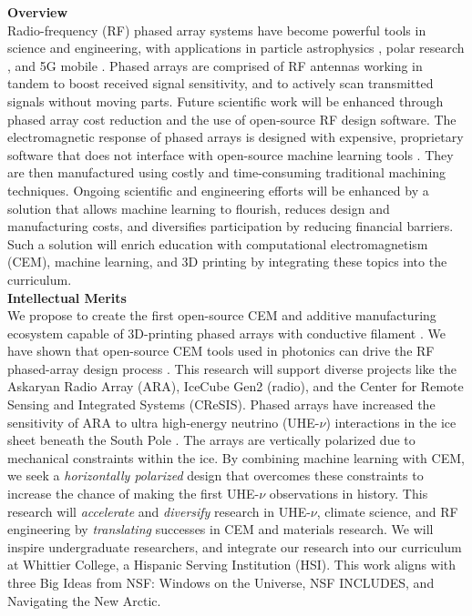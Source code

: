\documentclass[11pt]{amsart}
\begin{document}

\noindent \textbf{Overview} \\ \noindent Radio-frequency (RF) phased array systems have become powerful tools in science and engineering, with applications in particle astrophysics \cite{Vieregg_2016,AVVA201746,electronics10040415,rno}, polar research \cite{arnold_2020,9670670}, and 5G mobile \cite{5G_review_paper}.  Phased arrays are comprised of RF antennas working in tandem to boost received signal sensitivity, and to actively scan transmitted signals without moving parts.  Future scientific work will be enhanced through phased array cost reduction and the use of open-source RF design software.  The electromagnetic response of phased arrays is designed with expensive, proprietary software that does not interface with open-source machine learning tools \cite{10.3390/electronics8121506}.  They are then manufactured using costly and time-consuming traditional machining techniques.  Ongoing scientific and engineering efforts will be enhanced by a solution that allows machine learning to flourish, reduces design and manufacturing costs, and diversifies participation by reducing financial barriers.  Such a solution will enrich education with computational electromagnetism (CEM), machine learning, and 3D printing by integrating these topics into the curriculum. \\

\noindent \textbf{Intellectual Merits} \\ \noindent We propose to create the first open-source CEM and additive manufacturing ecosystem capable of 3D-printing phased arrays with conductive filament \cite{10.3390/electronics8121506, yurduseven,8786183}.  We have shown that open-source CEM tools used in photonics can drive the RF phased-array design process \cite{electronics10040415}.  This research will support diverse projects like the Askaryan Radio Array (ARA), IceCube Gen2 (radio), and the Center for Remote Sensing and Integrated Systems (CReSIS).  Phased arrays have increased the sensitivity of ARA to ultra high-energy neutrino (UHE-$\nu$) interactions in the ice sheet beneath the South Pole \cite{PhysRevD.105.122006}.  The arrays are vertically polarized due to mechanical constraints within the ice.  By combining machine learning with CEM, we seek a \textit{horizontally polarized} design that overcomes these constraints to increase the chance of making the first UHE-$\nu$ observations in history.  This research will \textit{accelerate} and \textit{diversify} research in UHE-$\nu$, climate science, and RF engineering by \textit{translating} successes in CEM and materials research.  We will inspire undergraduate researchers, and integrate our research into our curriculum at Whittier College, a Hispanic Serving Institution (HSI).  This work aligns with three Big Ideas from NSF: Windows on the Universe, NSF INCLUDES, and Navigating the New Arctic. \\
\end{document}
